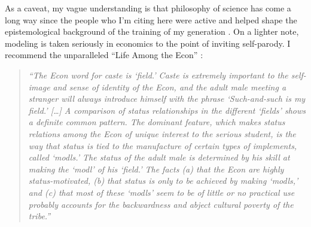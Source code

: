 \documentclass[graybox]{svmult}
\begin{document}
As a caveat, my vague understanding is that philosophy of science has come a long way since the people who I'm citing here were active and helped shape the epistemological background of the training of my generation \citep{Schindler2018}. On a lighter note, modeling is taken seriously in economics to the point of inviting self-parody. I recommend the unparalleled ``Life Among the Econ'' \citep{Leijonhufvud1973}:
\begin{quote}\it
``The Econ word for caste is `field.' Caste is extremely important to the self-image and sense of identity of the Econ, and the adult male meeting a stranger will always introduce himself with the phrase `Such-and-such is my field.' [\ldots] A comparison of status relationships in the different `fields' shows a definite common pattern. The dominant feature, which makes status relations among the Econ of unique interest to the serious student, is the way that status is tied to the manufacture of certain types of implements, called `modls.' The status of the adult male is determined by his skill at making the `modl' of his `field.' The facts (a) that the Econ are highly status-motivated, (b) that status is only to be achieved by making `modls,' and (c) that most of these `modls' seem to be of little or no practical use probably accounts for the backwardness and abject cultural poverty of the tribe.''
\end{quote}
%
\end{document}
